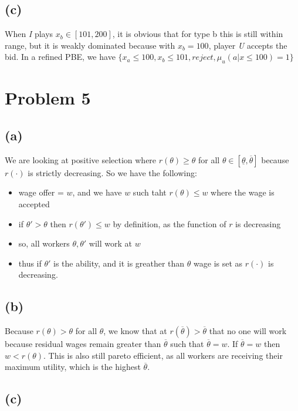 \documentclass{article}
\begin{document}
\subsection*{(c)}

When \textit{I} plays $x_b \in [101,200]$, it is obvious that for type b this is still within range, but it is weakly dominated because with $x_b = 100$, player \textit{U} accepts the bid. In a refined PBE, we have $\{x_a \leq 100, x_b \leq 101, reject, \mu_u(a|x \leq 100) = 1\}$

\section{Problem 5}

\subsection*{(a)}
We are looking at positive selection where $r(\theta) \geq \theta$ for all $\theta \in [\underline{\theta}, \overline{\theta}]$ because $r(\cdot)$ is strictly decreasing. So we have the following: 
\begin{itemize}
    \item wage offer = $w$, and we have $w$ such taht $r(\theta) \leq w$ where the wage is accepted
    \item if $\theta' > \theta$ then $r(\theta') \leq w$ by definition, as the function of $r$ is decreasing
    \item so, all workers $\theta, \theta'$ will work at $w$
    \item thus if $\theta'$ is the ability, and it is greather than $\theta$ wage is set as $r(\cdot)$ is decreasing. 
\end{itemize}

\subsection*{(b)}

Because $r(\theta) > \theta$ for all $\theta$, we know that at $r(\overline\theta) > \overline\theta$ that no one will work because residual wages remain greater than $\overline{\theta}$ such that $\overline{\theta} = w$. If $\overline{\theta} = w$ then $w < r(\theta)$. This is also still pareto efficient, as all workers are receiving their maximum utility, which is the highest $\overline{\theta}$.

\subsection*{(c)}
\end{document}
